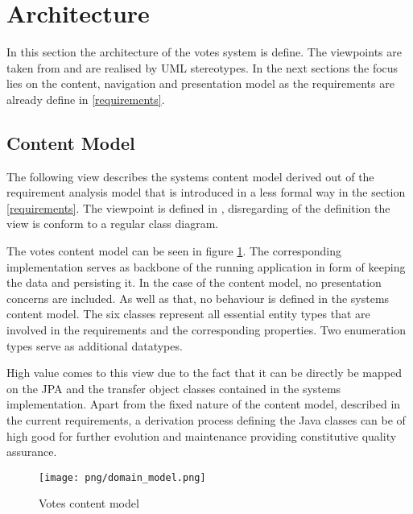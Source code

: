 \section{Architecture}


In this section the architecture of the votes system is define. The viewpoints are taken from \cite{Uwe08,uweref} and are realised by UML stereotypes. In the next sections the focus lies on the content, navigation and presentation model as the requirements are already define in \ref{requirements}.



\subsection{Content Model}
The following view describes the systems content model derived out of the requirement analysis model that is introduced in a less formal way in the section \ref{requirements}. The viewpoint is defined in \cite{Uwe08,uweref}, disregarding of the definition the view is conform to a regular class diagram. 

The votes content model can be seen in figure \ref{content_model}. The corresponding implementation serves as backbone of the running application in form of keeping the data and persisting it. In the case of the content model, no presentation concerns are included. As well as that, no behaviour is defined in the systems content model. The six classes represent all essential entity types that are involved in the requirements and the corresponding properties. Two enumeration types serve as additional datatypes. 

High value comes to this view due to the fact that it can be directly be mapped on the JPA and the transfer object classes contained in the systems implementation. Apart from the fixed nature of the content model, described in the current requirements, a derivation process defining the Java classes can be of high good for further evolution and maintenance providing constitutive quality assurance.

\begin{figure}
\label{content_model}
\centering
\texttt{[image: png/domain\_model.png]}
\caption{Votes content model}
\end{figure}


